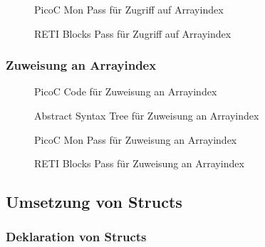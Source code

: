 \begin{figure}[H]
  \centering
  \caption{PicoC Mon Pass für Zugriff auf Arrayindex}
  \label{fig:picoc_mon_für_zugriff_auf_arrayindex}
\end{figure}

\begin{figure}[H]
  \centering
  \caption{RETI Blocks Pass für Zugriff auf Arrayindex}
  \label{fig:reti_blocks_für_zugriff_auf_arrayindex}
\end{figure}

\subsubsection{Zuweisung an Arrayindex}
\begin{figure}[H]
  \centering
  \caption{PicoC Code für Zuweisung an Arrayindex}
  \label{fig:picoc_code_für_array_assignment}
\end{figure}

\begin{figure}[H]
  \centering
  \caption{Abstract Syntax Tree für Zuweisung an Arrayindex}
  \label{fig:abstract_syntax_tree_für_array_assignment}
\end{figure}

\begin{figure}[H]
  \centering
  \caption{PicoC Mon Pass für Zuweisung an Arrayindex}
  \label{fig:picoc_mon_für_array_assignment}
\end{figure}

\begin{figure}[H]
  \centering
  \caption{RETI Blocks Pass für Zuweisung an Arrayindex}
  \label{fig:reti_blocks_für_array_assignment}
\end{figure}

\subsection{Umsetzung von Structs}
\subsubsection{Deklaration von Structs}
